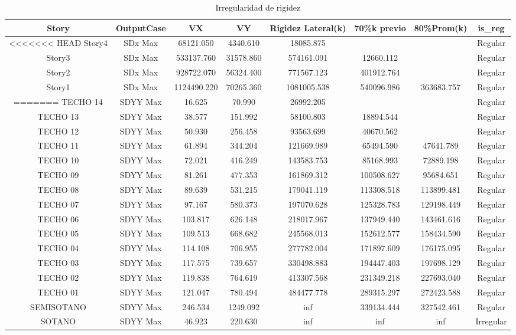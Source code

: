 \documentclass{article}%
\begin{document}
%


\begin{table}[h!]%
\centering%
\caption{Irregularidad de rigidez}%
\begin{tabular}{cccccccc}
\toprule
Story & OutputCase & VX & VY & Rigidez Lateral(k) & 70\%k previo & 80\%Prom(k) & is\_reg \\
\midrule
<<<<<<< HEAD
Story4 & SDx Max & 68121.050 & 4340.610 & 18085.875 &  &  & Regular \\
Story3 & SDx Max & 533137.760 & 31578.860 & 574161.091 & 12660.112 &  & Regular \\
Story2 & SDx Max & 928722.070 & 56324.400 & 771567.123 & 401912.764 &  & Regular \\
Story1 & SDx Max & 1124490.220 & 70265.360 & 1081005.538 & 540096.986 & 363683.757 & Regular \\
=======
TECHO 14 & SDYY Max & 16.625 & 70.990 & 26992.205 &  &  & Regular \\
TECHO 13 & SDYY Max & 38.577 & 151.992 & 58100.803 & 18894.544 &  & Regular \\
TECHO 12 & SDYY Max & 50.930 & 256.458 & 93563.699 & 40670.562 &  & Regular \\
TECHO 11 & SDYY Max & 61.894 & 344.204 & 121669.989 & 65494.590 & 47641.789 & Regular \\
TECHO 10 & SDYY Max & 72.021 & 416.249 & 143583.753 & 85168.993 & 72889.198 & Regular \\
TECHO 09 & SDYY Max & 81.261 & 477.353 & 161869.312 & 100508.627 & 95684.651 & Regular \\
TECHO 08 & SDYY Max & 89.639 & 531.215 & 179041.119 & 113308.518 & 113899.481 & Regular \\
TECHO 07 & SDYY Max & 97.167 & 580.373 & 197070.628 & 125328.783 & 129198.449 & Regular \\
TECHO 06 & SDYY Max & 103.817 & 626.148 & 218017.967 & 137949.440 & 143461.616 & Regular \\
TECHO 05 & SDYY Max & 109.513 & 668.682 & 245568.013 & 152612.577 & 158434.590 & Regular \\
TECHO 04 & SDYY Max & 114.108 & 706.955 & 277782.004 & 171897.609 & 176175.095 & Regular \\
TECHO 03 & SDYY Max & 117.575 & 739.657 & 330498.883 & 194447.403 & 197698.129 & Regular \\
TECHO 02 & SDYY Max & 119.838 & 764.619 & 413307.568 & 231349.218 & 227693.040 & Regular \\
TECHO 01 & SDYY Max & 121.047 & 780.494 & 484477.778 & 289315.297 & 272423.588 & Regular \\
SEMISOTANO & SDYY Max & 246.534 & 1249.092 & inf & 339134.444 & 327542.461 & Regular \\
SOTANO & SDYY Max & 46.923 & 220.630 & inf & inf & inf & Irregular \\
\bottomrule
\end{tabular}
%
\end{table}
\end{document}
